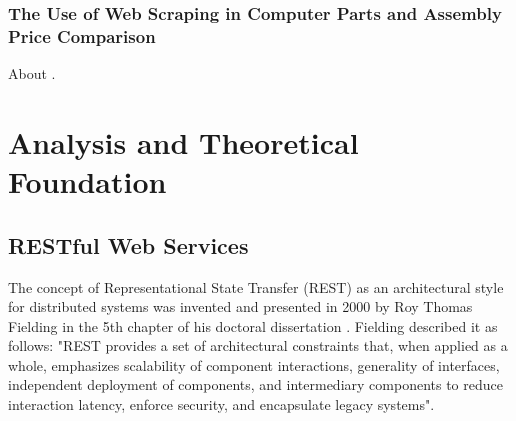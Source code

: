 \documentclass[12pt,a4paper,twoside]{report}
\begin{document}
\subsection{The Use of Web Scraping in Computer Parts and Assembly Price Comparison}

About \cite{pc_build_tracker}.


\chapter{Analysis and Theoretical Foundation}

\section{RESTful Web Services}

The concept of Representational State Transfer (REST) as an architectural style for distributed systems was invented and presented in 2000 by Roy Thomas Fielding in the 5th chapter of his doctoral dissertation \cite{fielding_rest_definition}. Fielding described it as follows: "REST provides a set of architectural constraints that, when applied as a whole, emphasizes scalability of component interactions, generality of interfaces, independent deployment of components, and intermediary components to reduce interaction latency, enforce security, and encapsulate legacy systems".
\end{document}
